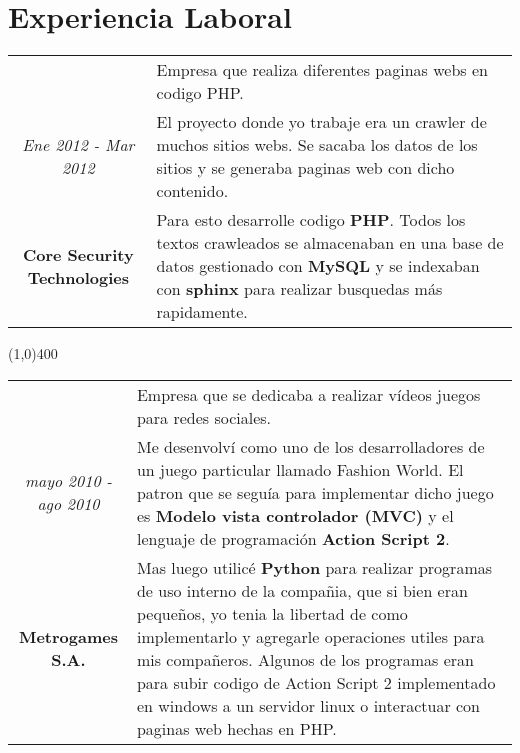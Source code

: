 \section{Experiencia Laboral}

\begin{tabular}{c|p{12.5cm}}
& \large Empresa que realiza diferentes paginas webs en codigo PHP.\\
\large\textit{Ene 2012 - Mar 2012} &  \large El proyecto donde yo trabaje era un crawler de muchos sitios webs. Se sacaba los datos de los sitios y se generaba paginas web con dicho contenido.\\
\large\textbf{Core Security Technologies} & \large Para esto desarrolle codigo \textbf{PHP}. Todos los textos crawleados se almacenaban en una base de datos gestionado con \textbf{MySQL} y se indexaban con \textbf{sphinx} para realizar busquedas más rapidamente.\\
\end{tabular}

\begin{center}
\line(1,0){400}
\end{center}
\noindent
\begin{tabular}{c|p{12.5cm}}
& \large Empresa que se dedicaba a realizar vídeos juegos para redes sociales.\\
\large\textit{mayo 2010 - ago 2010} &  \large Me desenvolví como uno de los desarrolladores de un juego particular llamado Fashion World. El patron que se seguía para implementar dicho juego es \textbf{Modelo vista controlador (MVC)} y el lenguaje de programación \textbf{Action Script 2}.\\
\large\textbf{Metrogames S.A.} & \large Mas luego utilicé \textbf{Python} para realizar programas de uso interno de la compañia, que si bien eran pequeños, yo tenia la libertad de como implementarlo y agregarle operaciones utiles para mis compañeros. Algunos de los programas eran para subir codigo de Action Script 2 implementado en windows a un servidor linux o interactuar con paginas web hechas en PHP.
\end{tabular}

